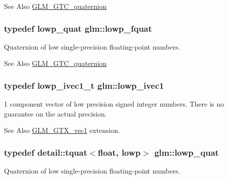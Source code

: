 \begin{DoxySeeAlso}{See Also}
\hyperlink{group__gtc__quaternion}{G\-L\-M\-\_\-\-G\-T\-C\-\_\-quaternion} 
\end{DoxySeeAlso}
\hypertarget{namespaceglm_aad1f5b3c348c223fb36e28f646552cff}{
\subsubsection[{lowp\-\_\-fquat}]{\setlength{\rightskip}{0pt plus 5cm}typedef {\bf lowp\-\_\-quat} {\bf glm\-::lowp\-\_\-fquat}}}\label{namespaceglm_aad1f5b3c348c223fb36e28f646552cff}
Quaternion of low single-\/precision floating-\/point numbers.

\begin{DoxySeeAlso}{See Also}
\hyperlink{group__gtc__quaternion}{G\-L\-M\-\_\-\-G\-T\-C\-\_\-quaternion} 
\end{DoxySeeAlso}
\hypertarget{namespaceglm_a5d781b915bec50a9d5b5383835035533}{
\subsubsection[{lowp\-\_\-ivec1}]{\setlength{\rightskip}{0pt plus 5cm}typedef {\bf lowp\-\_\-ivec1\-\_\-t} {\bf glm\-::lowp\-\_\-ivec1}}}\label{namespaceglm_a5d781b915bec50a9d5b5383835035533}
1 component vector of low precision signed integer numbers. There is no guarantee on the actual precision. \begin{DoxySeeAlso}{See Also}
\hyperlink{group__gtx__vec1}{G\-L\-M\-\_\-\-G\-T\-X\-\_\-vec1} extension. 
\end{DoxySeeAlso}
\hypertarget{namespaceglm_aefc1d896fa40939955d68b2c68c33cc8}{
\subsubsection[{lowp\-\_\-quat}]{\setlength{\rightskip}{0pt plus 5cm}typedef {\bf detail\-::tquat}$<$float, lowp$>$ {\bf glm\-::lowp\-\_\-quat}}}\label{namespaceglm_aefc1d896fa40939955d68b2c68c33cc8}
Quaternion of low single-\/precision floating-\/point numbers.

